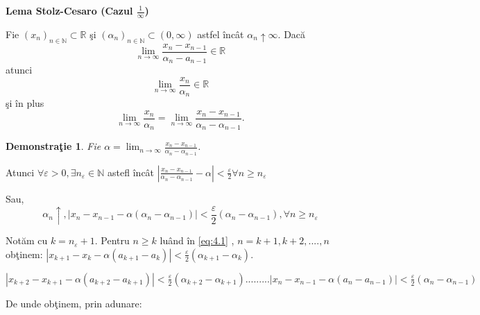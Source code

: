 \documentclass[a4paper,12pt,oneside]{report}
\newtheorem{demonstration}{Demonstra\c tie}
\begin{document}
\textbf{Lema Stolz-Cesaro (Cazul \(\frac{1}{\infty }\))}

Fie \(\left ( x_{n} \right )_{n\in \mathbb{N}}\subset \mathbb{R}\) \c si \(\left (\alpha _{n} \right )_{n\in \mathbb{N}}\subset \left ( 0,\infty \right )\) astfel \^ inc\^ at \(\alpha _{n} \uparrow \infty\). 
Dac\u a 
\begin{displaymath}
  \lim_{n \to \infty }\frac{x_{n} - x_{n-1}}{\alpha _{n}-a_{n-1}}\in \mathbb{R}
\end{displaymath}
	atunci 
\begin{displaymath}
  \lim_{n \to \infty }\frac{x_{n}}{ \alpha _{n}}\in \mathbb{R} 
\end{displaymath}
	\c si \^ in plus 
\begin{displaymath}
  \lim_{n \to \infty }\frac{x_{n}}{ \alpha _{n}}= \lim_{n \to \infty }\frac{x_{n} - x_{n-1}}{ \alpha _{n}- \alpha _{n-1}}.
\end{displaymath}

\begin{demonstration}
  Fie \(\alpha = \lim_{n \to \infty }\frac{x_{n}-x_{n-1}}{\alpha _{n}-\alpha _{n-1}}\). 
\end{demonstration}


Atunci \(\forall \varepsilon > 0,\exists n_{\varepsilon }\in \mathbb{N}\) astefl \^ inc\^ at \(\left | \frac{x_{n}-x_{n-1}}{\alpha _{n}- \alpha _{n-1}} - \alpha \right |< \frac{\varepsilon }{2} \forall  n\geq n_{\varepsilon  }\)

Sau, 
\begin{displaymath}
  \alpha _{n} \uparrow, 
\left | x_{n}- x_{n-1 }- \alpha \left ( \alpha _{n}-\alpha _{n-1} \right ) \right | < \frac{\varepsilon }{2}\left ( \alpha _{n}- \alpha _{n-1} \right ), \forall n\geq n_{\varepsilon } \label{eq:4.1} \tag{4.1}
\end{displaymath}


Not\u am cu \(k=n_{\varepsilon }+1\). Pentru \(n\geq k \) lu\^ and \^ in  \ref{eq:4.1} , \(n= k+1, k+2,....,n\) ob\c tinem:
\(\left | x_{k+1} - x_{k} - \alpha \left ( a_{k+1}- a_{k} \right ) \right |< \frac{\varepsilon }{2}\left ( \alpha _{k+1} - \alpha _{k} \right )\). 

\(\left | x_{k+2} - x_{k+1} - \alpha \left ( a_{k+2}- a_{k+1} \right ) \right |< \frac{\varepsilon }{2}\left ( \alpha _{k+2} - \alpha _{k+1} \right )
...
...
...
\left | x_{n} - x_{n-1} - \alpha \left ( a_{n}- a_{n-1} \right ) \right |< \frac{\varepsilon }{2}\left ( \alpha _{n} - \alpha _{n-1} \right )\)

De unde ob\c tinem, prin adunare:
\end{document}
